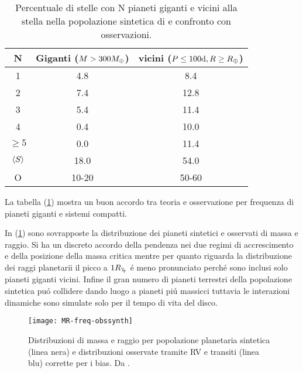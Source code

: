 
\begin{table}
\begin{tabular}{|ccc|}
\hline
N&Giganti ($M>300M_{\oplus}{}$)&vicini ($P\leq100\si{\day}, R\geq\rearth{}$)\\
\hline
1&4.8&8.4\\
2&7.4&12.8\\
3&5.4&11.4\\
4&0.4&10.0\\
$\geq5$&0.0&11.4\\
$\langle S \rangle$&18.0&54.0\\
O&10-20&50-60\\
\hline
\end{tabular}
\caption{Percentuale di stelle con N pianeti giganti e vicini alla stella nella popolazione sintetica di \cite{mordasini2018planetary} e confronto con osservazioni.}\label{tab:planetfreq}
\end{table}

La tabella (\ref{tab:planetfreq}) mostra un buon accordo tra teoria e osservazione per frequenza di pianeti giganti e sistemi compatti.

In (\ref{fig:MR-freq-obssynth}) sono sovrapposte la distribuzione dei pianeti sintetici e osservati di massa e raggio. Si ha un discreto accordo della pendenza nei due regimi di accrescimento e della posizione della massa critica mentre per quanto riguarda la distribuzione dei raggi planetarii il picco a $1\rjupiter{}$ \'e meno pronunciato perch\'e sono inclusi solo pianeti giganti vicini.
Infine il gran numero di pianeti terrestri della popolazione sintetica pu\'o collidere dando luogo a pianeti pi\'u massicci tuttavia le interazioni dinamiche sono simulate solo per il tempo di vita del disco.

\begin{figure}[!ht]\texttt{[image: MR-freq-obssynth]}\caption{Distribuzioni di massa e raggio per popolazione planetaria sintetica (linea nera) e distribuzioni osservate tramite RV e transiti (linea blu) corrette per i bias. Da \cite{mordasini2018planetary}.}\label{fig:MR-freq-obssynth}
\end{figure}

